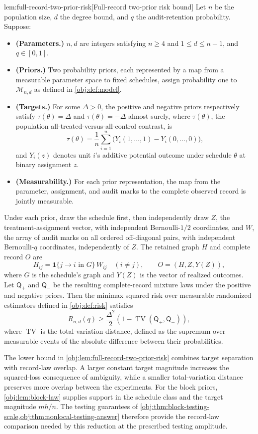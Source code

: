 \begin{lemmav}{lem:full-record-two-prior-risk}[Full-record two-prior risk bound]
Let \(n\) be the population size, \(d\) the degree bound, and \(q\) the audit-retention probability. Suppose:
\begin{itemize}
\item \textbf{(Parameters.)} \(n,d\) are integers satisfying \(n\ge4\) and \(1\le d\le n-1\), and \(q\in[0,1]\).
\item \textbf{(Priors.)} Two probability priors, each represented by a map from a measurable parameter space to fixed schedules, assign probability one to \(\mathcal M_{n,d}\) as defined in \cref{obj:def:model}.
\item \textbf{(Targets.)} For some \(\Delta>0\), the positive and negative priors respectively satisfy \(\tau(\theta)=\Delta\) and \(\tau(\theta)=-\Delta\) almost surely, where \(\tau(\theta)\), the population all-treated-versus-all-control contrast, is
\[
\tau(\theta)=\frac1n\sum_{i=1}^{n}
\bigl(Y_i(1,\ldots,1)-Y_i(0,\ldots,0)\bigr),
\]
and \(Y_i(z)\) denotes unit \(i\)'s additive potential outcome under schedule \(\theta\) at binary assignment \(z\).
\item \textbf{(Measurability.)} For each prior representation, the map from the parameter, assignment, and audit marks to the complete observed record is jointly measurable.
\end{itemize}
Under each prior, draw the schedule first, then independently draw \(Z\), the treatment-assignment vector, with independent Bernoulli-\(1/2\) coordinates, and \(W\), the array of audit marks on all ordered off-diagonal pairs, with independent Bernoulli-\(q\) coordinates, independently of \(Z\). The retained graph \(H\) and complete record \(O\) are
\[
H_{ij}=\mathbf1\{j\to i\text{ in }G\}\,W_{ij}\quad(i\ne j),
\qquad
O=(H,Z,Y(Z)),
\]
where \(G\) is the schedule's graph and \(Y(Z)\) is the vector of realized outcomes. Let \(\mathsf Q_+\) and \(\mathsf Q_-\) be the resulting complete-record mixture laws under the positive and negative priors. Then the minimax squared risk over measurable randomized estimators defined in \cref{obj:def:risk} satisfies
\[
R_{n,d}(q)\ge
\frac{\Delta^2}{2}
\left(1-\operatorname{TV}(\mathsf Q_+,\mathsf Q_-)\right),
\]
where \(\operatorname{TV}\) is the total-variation distance, defined as the supremum over measurable events of the absolute difference between their probabilities.
\end{lemmav}

The lower bound in \cref{obj:lem:full-record-two-prior-risk} combines target separation with record-law overlap. A larger constant target magnitude increases the squared-loss consequence of ambiguity, while a smaller total-variation distance preserves more overlap between the experiments. For the block priors, \cref{obj:lem:block-law} supplies support in the schedule class and the target magnitude \(mh/n\). The testing guarantees of \cref{obj:thm:block-testing-scale,obj:thm:nonlocal-testing-answer} therefore provide the record-law comparison needed by this reduction at the prescribed testing amplitude.

